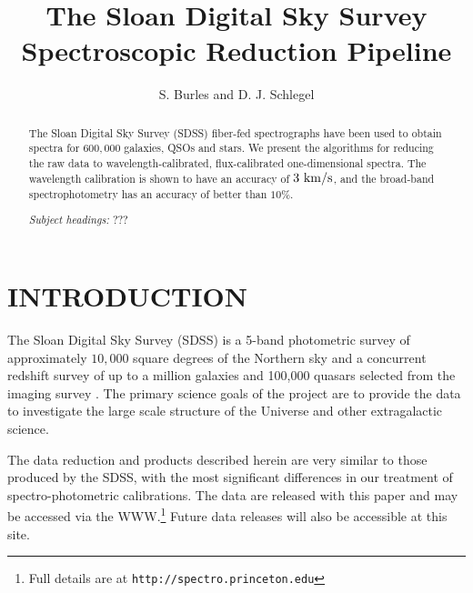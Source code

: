 \documentclass[12pt,preprint]{aastex}
\newcommand{\kms}{{\rm ~km/s}}
\begin{document}
\title{The Sloan Digital Sky Survey Spectroscopic Reduction Pipeline}

\author{
S. Burles\altaffilmark{\ref{MIT}}
and D. J. Schlegel\altaffilmark{\ref{Princeton}}
}


\begin{abstract}
The Sloan Digital Sky Survey (SDSS) fiber-fed spectrographs have been used
to obtain spectra for $600,000$ galaxies, QSOs and stars.
We present the algorithms for reducing the raw data to
wavelength-calibrated, flux-calibrated one-dimensional spectra.
The wavelength calibration is shown to have an accuracy of $3 \kms$,
and the broad-band spectrophotometry has an accuracy of better than $10\%$.

\emph{Subject headings: }
???
\end{abstract}

\section{INTRODUCTION}
\label{sec_intro}
The Sloan Digital Sky Survey (SDSS) is a 5-band photometric survey of
approximately $10,000$ square degrees of the Northern sky and a concurrent
redshift survey of up to a million galaxies and 100,000 quasars
selected from the imaging survey \cite{york00}.  The primary 
science goals of the project are to provide the data to investigate the
large scale structure of the Universe and other extragalactic science.

The data reduction and products described herein are very similar to
those produced by the SDSS, with the most significant differences
in our treatment of spectro-photometric calibrations.
The data are released
with this paper and may be accessed via the WWW.\footnote{Full details
are at \texttt{http://spectro.princeton.edu}}
Future data releases will also be accessible at this site. 
\end{document}
